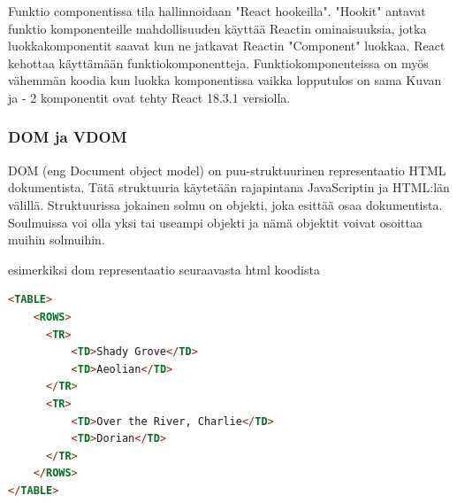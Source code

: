 
Funktio componentissa tila hallinnoidaan "React hookeilla"{}. 
"Hookit"{} antavat funktio komponenteille mahdollisuuden käyttää Reactin ominaisuuksia, 
jotka luokkakomponentit saavat kun ne jatkavat Reactin "Component"{} luokkaa.
%
React kehottaa käyttämään funktiokomponentteja. 
Funktiokomponenteissa on myös vähemmän koodia kun luokka komponentissa vaikka lopputulos on sama
Kuvan \prevImageCount{} ja {\the\numexpr \theimgCounter - 2}{} komponentit ovat tehty React 18.3.1 versiolla.





\medskip



\subsubsection{DOM ja VDOM}




DOM (eng Document object model) on puu-struktuurinen representaatio HTML dokumentista.
Tätä struktuuria käytetään rajapintana JavaScriptin ja HTML:län välillä. 
Struktuurissa jokainen solmu on objekti, joka esittää osaa dokumentista. 
Soulmuissa voi olla yksi tai useampi objekti ja nämä objektit voivat osoittaa muihin solmuihin.



esimerkiksi dom representaatio seuraavasta html koodista

    
\begin{tcolorbox}
\begin{lstlisting}[language=html]
<TABLE>
    <ROWS> 
      <TR> 
          <TD>Shady Grove</TD>
          <TD>Aeolian</TD> 
      </TR> 
      <TR>
          <TD>Over the River, Charlie</TD>
          <TD>Dorian</TD> 
      </TR> 
    </ROWS>
</TABLE>
\end{lstlisting}
\end{tcolorbox}


